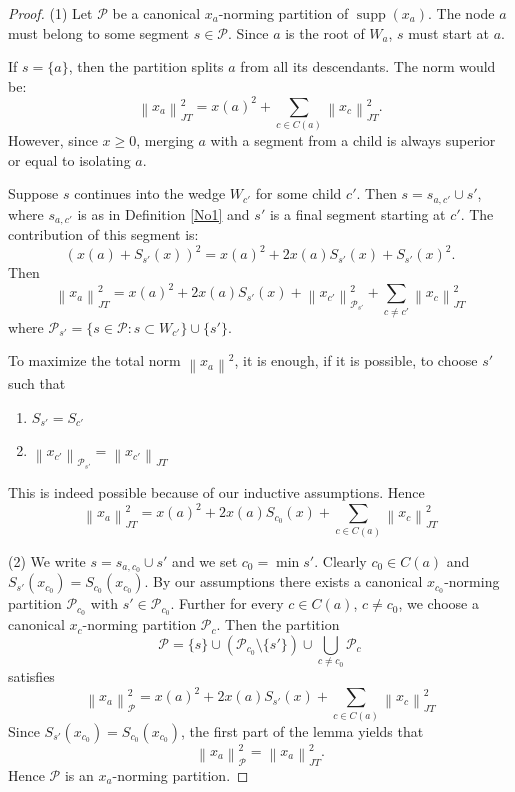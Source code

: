 \documentclass[11pt,a4paper]{amsart}
\newcommand{\JT}{JT}
\newcommand{\norm}[1]{\left\lVert#1\right\rVert}
\newcommand{\supp}{\operatorname{supp}}
\begin{document}
\begin{proof}
  (1) Let $\mathcal{P}$ be a canonical $x_a$-norming partition of $\supp(x_a)$. The node $a$ must belong to some segment $s \in \mathcal{P}$. Since $a$ is the root of $W_a$, $s$ must start at $a$.
    
    If $s = \{a\}$, then the partition splits $a$ from all its descendants. The norm would be:
    \[  \norm{x_a}_{\JT}^2 = x(a)^2 + \sum_{c \in C(a)} \norm{x_c}_{\JT}^2. \]
    However, since $x \ge 0$, merging $a$ with a segment from a child is always superior or equal to isolating $a$.
    
    Suppose $s$ continues into the wedge $W_{c'}$ for some child $c'$. Then $s = s_{a, c'} \cup s'$, where $s_{a, c'}$ is as in Definition \ref{No1} and $s'$ is a final segment starting at $c'$. The contribution of this segment is:
    \[ \left( x(a) + S_{s'}(x) \right)^2 = x(a)^2 + 2x(a)S_{s'}(x) + S_{s'}(x)^2. \]
    Then 
    \[ \norm{x_a}_{\JT}^2 = x(a)^2 + 2x(a)S_{s'}(x) + \norm{x_{c'}}_{\mathcal{P}_{s'}}^2 + \sum_{c \neq c'} \norm{x_c}_{\JT}^2 \]
    where $\mathcal{P}_{s'} = \{ s \in \mathcal{P}: s \subset W_{c'} \} \cup \{ s' \}$.
    
    To maximize the total norm $\norm{x_a}^2$, it is enough, if it is possible, to choose $s'$ such that 
    \begin{enumerate}
    \item $S_{s'} = S_{c'}$
    \item $\norm{x_{c'}}_{\mathcal{P}_{s'} } = \norm{x_{c'}}_{\JT}$
    \end{enumerate}
    This is indeed possible because of our inductive assumptions. Hence 
      \begin{equation}
        \norm{x_a}_{\JT}^2 = x(a)^2 + 2x(a)S_{c_0}(x) + \sum_{c \in C(a)} \norm{x_c}_{\JT}^2
    \end{equation}
    
    
    (2) We write $s = s_{a, c_0} \cup s'$ and we set $c_0 = \min s'$. Clearly $c_0 \in C(a)$ and $S_{s'}(x_{c_0}) = 
    S_{c_0}(x_{c_0})$. By our assumptions there exists a canonical $x_{c_0}$-norming partition $\mathcal{P}_{c_0}$ with
    $s'\in \mathcal{P}_{c_0}$. Further for every $c\in C(a)$, $c\ne c_0$, we choose a canonical $x_c$-norming partition $\mathcal{P}_c$. Then the partition 
    \[ \mathcal{P} = \{ s\} \cup (\mathcal{P}_{c_0}\setminus \{s'\}) \cup \bigcup_{c\ne c_0}\mathcal{P}_c \]
    satisfies 
       \begin{equation}
        \norm{x_a}_{\mathcal{P}}^2 = x(a)^2 + 2x(a)S_{s'}(x) + \sum_{c \in C(a)} \norm{x_c}_{\JT}^2
    \end{equation}
    Since $S_{s'}(x_{c_0}) =  S_{c_0}(x_{c_0})$, the first part of the lemma yields that 
    \[  \norm{x_a}_{\mathcal{P}}^2  =  \norm{x_a}_{\JT}^2. \]
    Hence $\mathcal{P}$ is an $x_a$-norming partition.
    
    \end{proof}
\end{document}
